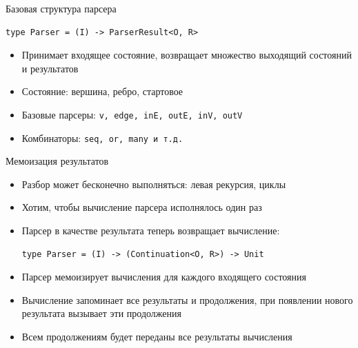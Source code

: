 \documentclass[aspectratio=169]{beamer}
\begin{document}
\begin{frame}[fragile]{Базовая структура парсера}
  \begin{verbatim}
type Parser = (I) -> ParserResult<O, R>
  \end{verbatim}
  \begin{itemize}
    \item Принимает входящее состояние, возвращает множество выходящий состояний и результатов
    \item Состояние: вершина, ребро, стартовое
    \item Базовые парсеры: \texttt{v, edge, inE, outE, inV, outV}
    \item Комбинаторы: \texttt{seq, or, many и т.д.}
  \end{itemize}

\end{frame}




\begin{frame}[fragile]{Мемоизация результатов}
  \begin{itemize}
    \item Разбор может бесконечно выполняться: левая рекурсия, циклы

    \item Хотим, чтобы вычисление парсера исполнялось один раз

    \item Парсер в качестве результата теперь возвращает вычисление:
          \begin{verbatim}
type Parser = (I) -> (Continuation<O, R>) -> Unit
\end{verbatim}
    \item Парсер мемоизирует вычисления для каждого входящего состояния

    \item Вычисление запоминает все результаты и продолжения, при появлении нового результата вызывает эти продолжения

    \item Всем продолжениям будет переданы все результаты вычисления

  \end{itemize}
\end{frame}
\end{document}
